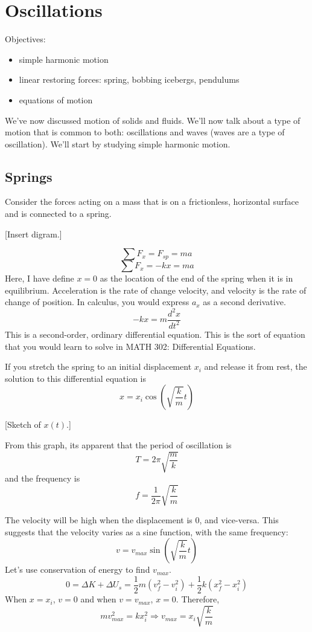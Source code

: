 \section{Oscillations}
Objectives:
\begin{itemize}
\item simple harmonic motion
\item linear restoring forces: spring, bobbing icebergs, pendulums
\item equations of motion
\end{itemize}

We've now discussed motion of solids and fluids. We'll now talk about a type of motion that is common to both: oscillations and waves (waves are a type of oscillation). We'll start by studying simple harmonic motion.

\subsection{Springs}
Consider the forces acting on a mass that is on a frictionless, horizontal surface and is connected to a spring.

[Insert digram.]\nopagebreak
\vspace{5cm}

$$\sum F_x = F_{sp}=ma$$
$$\sum F_x = -kx = ma$$
Here, I have define $x=0$ as the location of the end of the spring when it is in equilibrium. Acceleration is the rate of change velocity, and velocity is the rate of change of position. In calculus, you would express $a_x$ as a second derivative.
$$-kx=m\frac{d^2x}{dt^2}$$
This is a second-order, ordinary differential equation. This is the sort of equation that you would learn to solve in MATH 302: Differential Equations.

If you stretch the spring to an initial displacement $x_i$ and release it from rest, the solution to this differential equation is
$$x=x_i\cos\left(\sqrt{\frac{k}{m}}t\right)$$

[Sketch of $x(t)$.]\nopagebreak
\vspace{4cm}

From this graph, its apparent that the period of oscillation is 
$$\boxed{T=2\pi\sqrt{\frac{m}{k}}}$$
and the frequency is
$$\boxed{f=\frac{1}{2\pi}\sqrt{\frac{k}{m}}}$$

The velocity will be high when the displacement is 0, and vice-versa. This suggests that the velocity varies as a sine function, with the same frequency:
$$v = v_{max}\sin\left(\sqrt{\frac{k}{m}}t\right)$$
Let's use conservation of energy to find $v_{max}$.
$$0=\Delta K + \Delta U_s=\frac{1}{2}m\left(v_f^2-v_i^2\right)+\frac{1}{2}k\left(x_f^2-x_i^2\right)$$
When $x=x_i$, $v=0$ and when $v=v_{max}$, $x=0$. Therefore,
$$mv_{max}^2=kx_i^2\Rightarrow \boxed{v_{max}=x_i\sqrt{\frac{k}{m}}}$$

